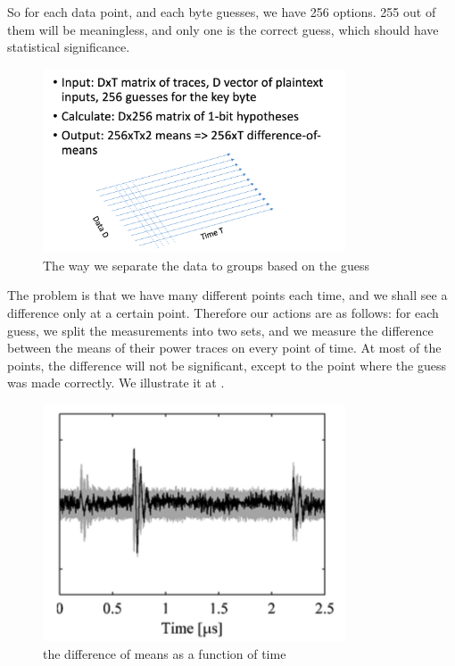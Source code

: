 So for each data point, and each byte guesses, we have 256 options. 
255 out of them will be meaningless, and only one is the correct guess, which should have statistical significance.

\begin{figure}[!ht]
    \centering
    \includegraphics[width=0.8\textwidth]{images/Lecture6/dpa-separation-figure.png}
    \caption{The way we separate the data to groups based on the guess} \label{fig:dpa-separation-figure}
\end{figure}


The problem is that we have many different points each time, and we shall see a difference only at a certain point. 
Therefore our actions are as follows: for each guess, we split the measurements into two sets, and we measure the difference between the means of their power traces on every point of time. 
At most of the points, the difference will not be significant, except to the point where the guess was made correctly. 
We illustrate it at .

\begin{figure}[!ht]
    \centering
    \includegraphics[width=0.8\textwidth]{images/Lecture6/meansDiffFigure.png}
    \caption{the difference of means as a function of time}
    \label{fig:meansDiffFigure}
\end{figure}

